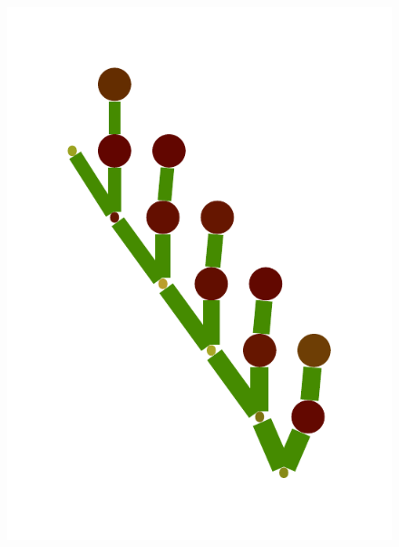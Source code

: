 \documentclass[a4paper,10pt]{article}
\begin{document}
\begin{figure}
{    \includegraphics[scale=.14]{./figures/6-4-vine-induced-8.pdf}
}
\end{figure}
\end{document}
